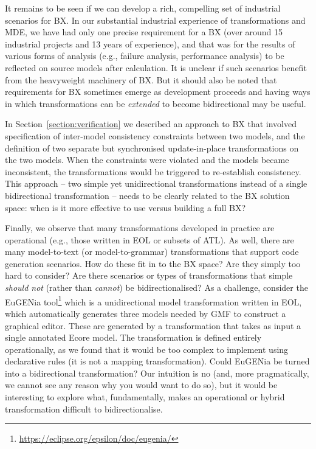 It remains to be seen if we can develop a rich, compelling set of industrial scenarios for BX. In our substantial industrial experience of transformations and MDE, we have had only one precise requirement for a BX (over around 15 industrial projects and 13 years of experience), and that was for the results of various forms of analysis (e.g., failure analysis, performance analysis) to be reflected on source models after calculation. It is unclear if such scenarios benefit from the heavyweight machinery of BX. But it should also be noted that requirements for BX sometimes emerge as development proceeds and having ways in which transformations can be \textit{extended} to become bidirectional may be useful.

In Section~\ref{section:verification} we described an approach to BX that involved specification of inter-model consistency constraints between two models, and the definition of two separate but synchronised update-in-place transformations on the two models. When the constraints were violated and the models became inconsistent, the transformations would be triggered to re-establish consistency. This approach -- two simple yet unidirectional transformations instead of a single bidirectional transformation -- needs to be clearly related to the BX solution space: when is it more effective to use versus building a full BX?

Finally, we observe that many transformations developed in practice are operational (e.g., those written in EOL or subsets of ATL). As well, there are many model-to-text (or model-to-grammar) transformations that support code generation scenarios. How do these fit in to the BX space? Are they simply too hard to consider? Are there scenarios or types of transformations that simple \textit{should not} (rather than \textit{cannot}) be bidirectionalised? As a challenge, consider the EuGENia tool\footnote{\url{https://eclipse.org/epsilon/doc/eugenia/}} which is a unidirectional model transformation written in EOL, which automatically generates three models needed by GMF to construct a graphical editor. These are generated by a transformation that takes as input a single annotated Ecore model. The transformation is defined entirely operationally, as we found that it would be too complex to implement using declarative rules (it is not a mapping transformation). Could EuGENia be turned into a bidirectional transformation? Our intuition is no (and, more pragmatically, we cannot see any reason why you would want to do so), but it would be interesting to explore what, fundamentally, makes an operational or hybrid transformation difficult to bidirectionalise.

